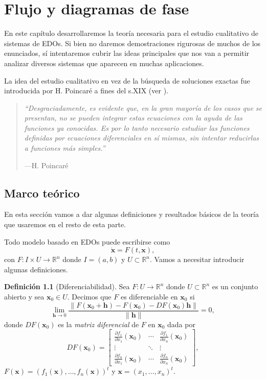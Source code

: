 \documentclass[12pt, a4paper]{amsbook}
\newcommand{\R}{{\mathbb R}}
\newcommand{\hh}{{\mathbf h}}
\newcommand{\xx}{{\mathbf x}}
\theoremstyle{remark}
\theoremstyle{definition}
\newtheorem{defi}[teo]{Definición}
\numberwithin{section}{chapter}
\numberwithin{subsection}{section}
\numberwithin{equation}{section}
\numberwithin{figure}{chapter}
\begin{document}
\chapter{Flujo y diagramas de fase}\label{cap:flujo}

En este capítulo desarrollaremos la teoría necesaria para el estudio cualitativo de sistemas de EDOs. Si bien no daremos demostraciones rigurosas de muchos de los enunciados, sí intentaremos cubrir las ideas principales que nos van a permitir analizar diversos sistemas que aparecen en muchas aplicaciones.

La idea del estudio cualitativo en vez de la búsqueda de soluciones exactas fue introducida por H. Poincaré a fines del s.XIX (ver \cite{Poincare}).

\begin{quote}
\emph{``Desgraciadamente, es evidente que, en la gran mayoría de los casos que se presentan, no se pueden integrar estas ecuaciones con la ayuda de las funciones ya conocidas. Es por lo tanto necesario estudiar las funciones definidas por ecuaciones diferenciales en sí mismas, sin intentar reducirlas a funciones más simples.''}

\hfill —H. Poincaré
\end{quote}



\section{Marco teórico}
En esta sección vamos a dar algunas definiciones y resultados básicos de la teoría que usaremos en el resto de esta parte.

Todo modelo basado en EDOs puede escribirse como
$$
\dot \xx = F(t, \xx),
$$
con $F\colon I\times U\to \R^n$ donde $I=(a, b)$ y $U\subset \R^n$. Vamos a necesitar introducir algunas definiciones.

\begin{defi}[Diferenciabilidad]
Sea $F\colon U\to \R^n$ donde $U\subset \R^n$ es un conjunto abierto y sea $\xx_0\in U$. Decimos que $F$ es diferenciable en $\xx_0$ si
$$
\lim_{\hh\to 0} \frac{\|F(\xx_0+\hh) - F(\xx_0) - DF(\xx_0)\hh\|}{\|\hh\|} = 0,
$$
donde $DF(\xx_0)$ es la {\em matriz diferencial} de $F$ en $\xx_0$ dada por
$$
DF(\xx_0) = \begin{bmatrix}
\frac{\partial f_1}{\partial x_1}(\xx_0) & \cdots & \frac{\partial f_1}{\partial x_n}(\xx_0)\\
\vdots & \ddots & \vdots \\
\frac{\partial f_n}{\partial x_1}(\xx_0) & \cdots & \frac{\partial f_n}{\partial x_n}(\xx_0)
\end{bmatrix}, 
$$
$F(\xx)=(f_1(\xx),\dots,f_n(\xx))^t$ y $\xx = (x_1,\dots,x_n)^t$.
\end{defi}
\end{document}
